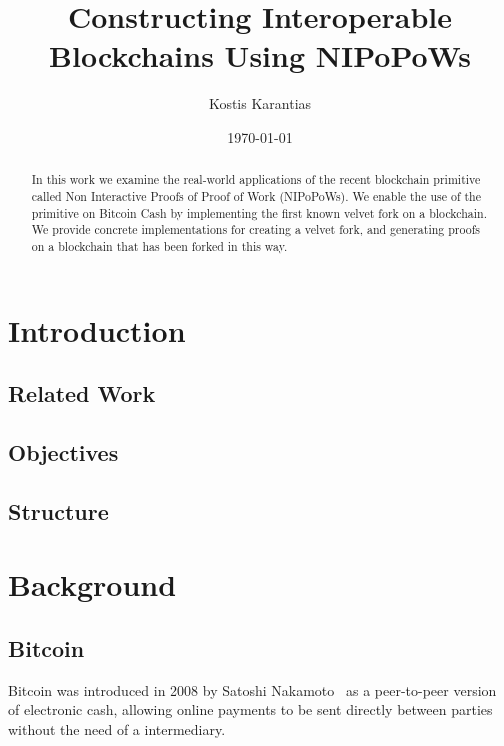 \documentclass[11pt]{llncs}
\begin{document}
\title{Constructing Interoperable Blockchains Using NIPoPoWs}
\date{\today}
\author{Kostis Karantias\\
    }
\maketitle
\noindent
\makebox[\linewidth]{\small \today}

\newpage

\begin{abstract}
  In this work we examine the real-world applications of the recent blockchain
  primitive called Non Interactive Proofs of Proof of Work (NIPoPoWs). We
  enable the use of the primitive on Bitcoin Cash by implementing the first
  known velvet fork on a blockchain. We provide concrete implementations for
  creating a velvet fork, and generating proofs on a blockchain that has been
  forked in this way.
\end{abstract}

\newpage

\tableofcontents

\newpage

\thispagestyle{plain}

\section{Introduction}

\subsection{Related Work}
\subsection{Objectives}
\subsection{Structure}

\section{Background}

\subsection{Bitcoin}
Bitcoin was introduced in 2008 by Satoshi Nakamoto~\cite{bitcoin} as a
peer-to-peer version of electronic cash, allowing online payments to be sent
directly between parties without the need of a intermediary.
\end{document}
